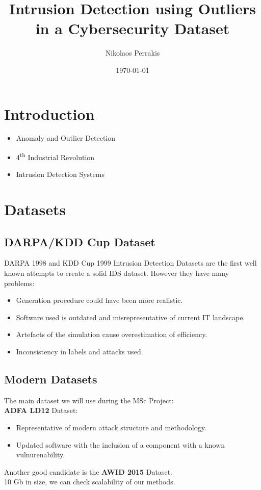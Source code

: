 \documentclass{beamer}
\title{Intrusion Detection using Outliers in a Cybersecurity Dataset}
\author{Nikolaos Perrakis}
\date{\today}
\begin{document}
\frame{\titlepage}

\section[Outline]{}
\frame{\tableofcontents}

\section{Introduction}
\frame
{

  \begin{itemize}
  \item Anomaly and Outlier Detection
  \item 4\textsuperscript{th} Industrial Revolution
  \item Intrusion Detection Systems
  \end{itemize}
}

\section{Datasets}
\subsection{DARPA/KDD Cup Dataset}
\frame
{
DARPA 1998 and KDD Cup 1999 Intrusion Detection Datasets are the first well known attempts to create a solid IDS dataset. However they have many problems\cite{ids3}:
\begin{itemize}
\item Generation procedure could have been more realistic.
\item Software used is outdated and misrepresentative of current IT landscape.
\item Artefacts of the simulation cause overestimation of efficiency.
\item Inconsistency in labels and attacks used.
\end{itemize}
}

\subsection{Modern Datasets}
\frame
{
The main dataset we will use during the MSc Project:\\
\textbf{ADFA LD12}\cite{dat2} Dataset:
\begin{itemize}
\item Representative of modern attack structure and methodology.
\item Updated software with the inclusion of a component with a known vulnurenability.
\end{itemize}
Another good candidate is the \textbf{AWID 2015}\cite{dat3} Dataset.\\ 
10 Gb in size, we can check scalability of our methods.
}
\end{document}

